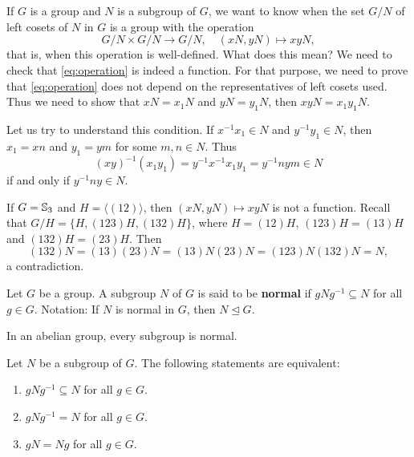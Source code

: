 \chapter{}


If $G$ is a group and $N$ is a subgroup of $G$, we want to know
when the set $G/N$ of left cosets 
of $N$ in $G$ is a group with 
the operation 
\begin{equation}
\label{eq:operation}
G/N\times G/N\to G/N,\quad 
(xN,yN)\mapsto xyN,
\end{equation}
that is, when this operation 
is well-defined. 
What does this mean? We need to check that
\eqref{eq:operation} is indeed a function. 
For that purpose, we need to prove that
\eqref{eq:operation} does not depend on the representatives of left
cosets used. Thus we need to show that 
$xN=x_1N$ and $yN=y_1N$, then 
$xyN=x_1y_1N$. 

Let us try to understand this condition. If $x^{-1}x_1\in N$ and 
$y^{-1}y_1\in N$, then $x_1=xn$ and $y_1=ym$ for some 
$m,n\in N$. Thus 
\[
(xy)^{-1}(x_1y_1)=y^{-1}x^{-1}x_1y_1=y^{-1}nym\in N
\]
if and only if $y^{-1}ny\in N$.

\begin{example}
If $G=\mathbb{S}_3$ and $H=\langle (12)\rangle$, then $(xN,yN)\mapsto xyN$ is not a function. Recall that 
$G/H=\{H,(123)H,(132)H\}$, where 
$H=(12)H$, $(123)H=(13)H$ and $(132)H=(23)H$. Then 
\[
(132)N=(13)(23)N=(13)N(23)N=(123)N(132)N=N,
\]
a contradiction.
\end{example}

\begin{definition}
    Let $G$ be a group. 
    A subgroup $N$ of $G$ is said to be \textbf{normal} if $gNg^{-1}\subseteq N$ for all $g\in G$.
    Notation: If $N$ is normal in $G$, then $N\unlhd G$.
\end{definition}

In an abelian group, every subgroup is normal. 

\begin{proposition}
\label{pro:normalidad}
Let $N$ be a subgroup of $G$. 
The following statements are equivalent:
\begin{enumerate}
        \item $gNg^{-1}\subseteq N$ for all $g\in G$.
        \item $gNg^{-1}=N$ for all $g\in G$.
        \item $gN=Ng$ for all $g\in G$.
\end{enumerate}
\end{proposition}

